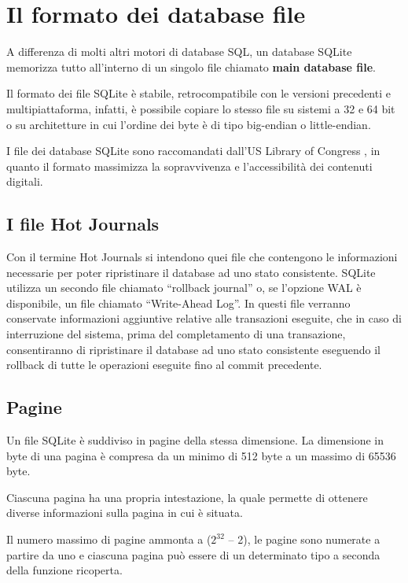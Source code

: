 
\chapter{Il formato dei database file}

A differenza di molti altri motori di database SQL, un database SQLite memorizza tutto all’interno di un singolo file chiamato \textbf{main database file}. 

Il formato dei file SQLite è stabile, retrocompatibile con le versioni precedenti e multipiattaforma, infatti, è possibile copiare lo stesso file su sistemi a 32 e 64 bit o su architetture in cui l’ordine dei byte è di tipo big-endian o little-endian.

I file dei database SQLite sono raccomandati dall’US Library of Congress \cite{uslibraryofcongress}, in quanto il formato massimizza la sopravvivenza e l’accessibilità dei contenuti digitali.

\section{I file Hot Journals}
Con il termine Hot Journals si intendono quei file che contengono le informazioni necessarie per poter ripristinare il database ad uno stato consistente.
SQLite utilizza un secondo file chiamato “rollback journal” o, se l’opzione WAL è disponibile, un file chiamato “Write-Ahead Log”.
In questi file verranno conservate informazioni aggiuntive relative alle transazioni eseguite, che in caso di interruzione del sistema, prima del completamento di una transazione, consentiranno di ripristinare il database ad uno stato consistente eseguendo il rollback di tutte le operazioni eseguite fino al commit precedente.


\section{Pagine}
Un file SQLite è suddiviso in pagine della stessa dimensione. La dimensione in byte di una pagina è compresa da un minimo di 512 byte a un massimo di 65536 byte. 

Ciascuna pagina ha una propria intestazione, la quale permette di ottenere diverse informazioni sulla pagina in cui è situata. 

Il numero massimo di pagine ammonta a ($2^{32}$ – 2), le pagine sono numerate a partire da uno e ciascuna pagina può essere di un determinato tipo a seconda della funzione ricoperta.

